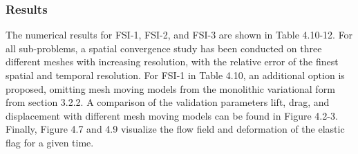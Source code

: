 \subsubsection*{Results}
The numerical results for FSI-1, FSI-2, and FSI-3  are shown in Table 4.10-12. For all sub-problems, a spatial convergence study has been conducted on three different meshes with increasing resolution, with the relative error of the finest spatial and temporal resolution. For FSI-1 in Table 4.10, an additional option is proposed, omitting mesh moving models from the monolithic variational form from section 3.2.2.  A comparison of the validation parameters lift, drag, and displacement with different mesh moving models can be found in Figure 4.2-3. Finally, Figure 4.7 and 4.9 visualize the flow field and deformation of the elastic flag for a given time.
 
 \newpage
